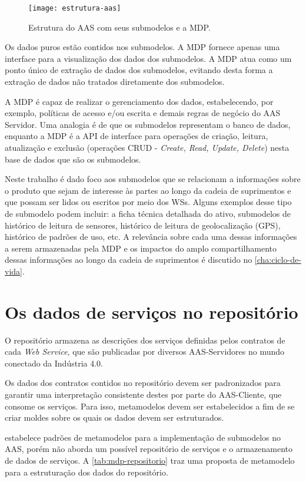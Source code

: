 \begin{figure}[htb]
	\centering
	\texttt{[image: estrutura-aas]}
	\caption{Estrutura do AAS com seus submodelos e a MDP.}
	\label{fig:estrutura-aas}
\end{figure}

Os dados puros estão contidos nos submodelos. A MDP fornece apenas uma interface para a visualização dos dados dos submodelos. A MDP atua como um ponto único de extração de dados dos submodelos, evitando desta forma a extração de dados não tratados diretamente dos submodelos.

A MDP é capaz de realizar o gerenciamento dos dados, estabelecendo, por exemplo, políticas de acesso e/ou escrita e demais regras de negócio do AAS Servidor. Uma analogia é de que os submodelos representam o banco de dados, enquanto a MDP é a API de interface para operações de criação, leitura, atualização e exclusão (operações CRUD - \textit{Create, Read, Update, Delete}) nesta base de dados que são os submodelos.

Neste trabalho é dado foco aos submodelos que se relacionam a informações sobre o produto que sejam de interesse às partes ao longo da cadeia de suprimentos e que possam ser lidos ou escritos por meio dos WSs. Alguns exemplos desse tipo de submodelo podem incluir: a ficha técnica detalhada do ativo, submodelos de histórico de leitura de sensores, histórico de leitura de geolocalização (GPS), histórico de padrões de uso, etc. A relevância sobre cada uma dessas informações a serem armazenadas pela MDP e os impactos do amplo compartilhamento dessas informações ao longo da cadeia de suprimentos é discutido no \autoref{cha:ciclo-de-vida}.

\section{Os dados de serviços no repositório}

O repositório armazena as descrições dos serviços definidas pelos contratos de cada \textit{Web Service}, que são publicadas por diversos AAS-Servidores no mundo conectado da Indústria 4.0.

Os dados dos contratos contidos no repositório devem ser padronizados para garantir uma interpretação consistente destes por parte do AAS-Cliente, que consome os serviços. Para isso, metamodelos devem ser estabelecidos a fim de se criar moldes sobre os quais os dados devem ser estruturados.

 estabelece padrões de metamodelos para a implementação de submodelos no AAS, porém não aborda um possível repositório de serviços e o armazenamento de dados de serviços. A \autoref{tab:mdp-repositorio} traz uma proposta de metamodelo para a estruturação dos dados do repositório.

